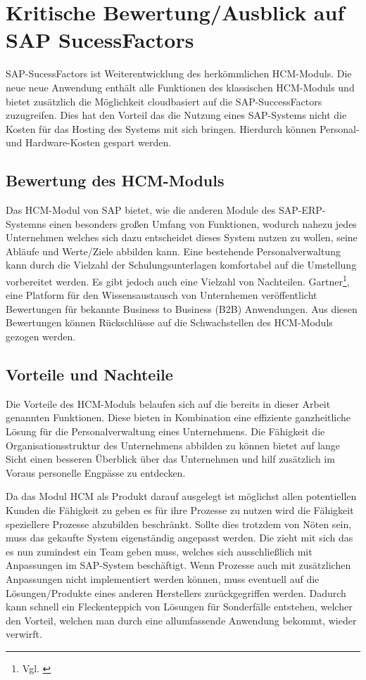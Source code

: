 
\section{Kritische Bewertung/Ausblick auf SAP SucessFactors} 
\label{sec:bewertungundausblick}

SAP-SucessFactors ist Weiterentwicklung des herkömmlichen HCM-Moduls. Die neue neue Anwendung enthält alle Funktionen des klassischen HCM-Moduls und bietet zusätzlich die Möglichkeit cloudbasiert auf die SAP-SuccessFactors zuzugreifen. Dies hat den Vorteil das die Nutzung eines SAP-Systems nicht die Kosten für das Hosting des Systems mit sich bringen. Hierdurch können Personal- und Hardware-Kosten gespart werden. 

\subsection{Bewertung des HCM-Moduls}
Das HCM-Modul von SAP bietet, wie die anderen Module des SAP-ERP-Systemns einen besonders großen Umfang von Funktionen, wodurch nahezu jedes Unternehmen welches sich dazu entscheidet dieses System nutzen zu wollen, seine Abläufe und Werte/Ziele abbilden kann. Eine bestehende Personalverwaltung kann durch die Vielzahl der Schulungsunterlagen komfortabel auf die Umstellung vorbereitet werden. Es gibt jedoch auch eine Vielzahl von Nachteilen. Gartner\footnote{Vgl. \cite{Gartner2024}}, eine Platform für den Wissensaustausch von Unternhemen veröffentlicht Bewertungen für bekannte Business to Business (B2B) Anwendungen. Aus diesen Bewertungen können Rückschlüsse auf die Schwachstellen des HCM-Moduls gezogen werden. 

\subsection{Vorteile und Nachteile}
Die Vorteile des HCM-Moduls belaufen sich auf die bereits in dieser Arbeit genannten Funktionen. Diese bieten in Kombination eine effiziente ganzheitliche Lösung für die Personalverwaltung eines Unternehmens. Die Fähigkeit die Organisationsstruktur des Unternehmens abbilden zu können bietet auf lange Sicht einen besseren Überblick über das Unternehmen und hilf zusätzlich im Voraus personelle Engpässe zu entdecken. 

Da das Modul HCM als Produkt darauf ausgelegt ist möglichst allen potentiellen Kunden die Fähigkeit zu geben es für ihre Prozesse zu nutzen wird die Fähigkeit speziellere Prozesse abzubilden beschränkt. Sollte dies trotzdem von Nöten sein, muss das gekaufte System eigenständig angepasst werden. Die zieht mit sich das es nun zumindest ein Team geben muss, welches sich ausschließlich mit Anpassungen im SAP-System beschäftigt. Wenn Prozesse auch mit zusätzlichen Anpassungen nicht implementiert werden können, muss eventuell auf die Lösungen/Produkte eines anderen Herstellers zurückgegriffen werden. Dadurch kann schnell ein Fleckenteppich von Lösungen für Sonderfälle entstehen, welcher den Vorteil, welchen man durch eine allumfassende Anwendung bekommt, wieder verwirft. 

